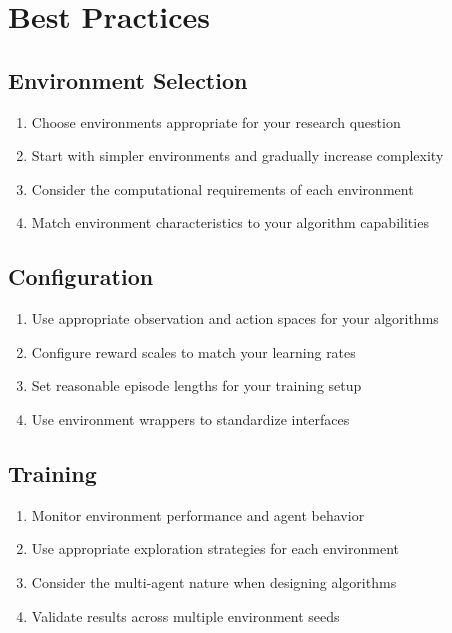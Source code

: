 \section{Best Practices}

\subsection{Environment Selection}

\begin{enumerate}
    \item Choose environments appropriate for your research question
    \item Start with simpler environments and gradually increase complexity
    \item Consider the computational requirements of each environment
    \item Match environment characteristics to your algorithm capabilities
\end{enumerate}

\subsection{Configuration}

\begin{enumerate}
    \item Use appropriate observation and action spaces for your algorithms
    \item Configure reward scales to match your learning rates
    \item Set reasonable episode lengths for your training setup
    \item Use environment wrappers to standardize interfaces
\end{enumerate}

\subsection{Training}

\begin{enumerate}
    \item Monitor environment performance and agent behavior
    \item Use appropriate exploration strategies for each environment
    \item Consider the multi-agent nature when designing algorithms
    \item Validate results across multiple environment seeds
\end{enumerate}

